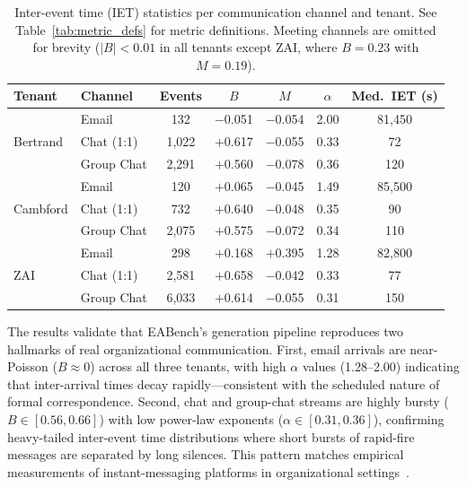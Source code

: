 \begin{table}[h]
\centering
\caption{Inter-event time (IET) statistics per communication channel and tenant. See Table~\ref{tab:metric_defs} for metric definitions. Meeting channels are omitted for brevity ($|B| < 0.01$ in all tenants except ZAI, where $B = 0.23$ with $M = 0.19$).}
\label{tab:iet_summary}
\small
\begin{tabular}{llccccc}
\toprule
\textbf{Tenant} & \textbf{Channel} & \textbf{Events} & \textbf{$B$} & \textbf{$M$} & \textbf{$\alpha$} & \textbf{Med.\ IET (s)} \\
\midrule
\multirow{3}{*}{Bertrand}
  & Email      & 132   & $-$0.051 & $-$0.054 & 2.00 & 81{,}450 \\
  & Chat (1:1) & 1{,}022 & $+$0.617 & $-$0.055 & 0.33 & 72       \\
  & Group Chat & 2{,}291 & $+$0.560 & $-$0.078 & 0.36 & 120      \\
\midrule
\multirow{3}{*}{Cambford}
  & Email      & 120   & $+$0.065 & $-$0.045 & 1.49 & 85{,}500 \\
  & Chat (1:1) & 732   & $+$0.640 & $-$0.048 & 0.35 & 90       \\
  & Group Chat & 2{,}075 & $+$0.575 & $-$0.072 & 0.34 & 110      \\
\midrule
\multirow{3}{*}{ZAI}
  & Email      & 298   & $+$0.168 & $+$0.395 & 1.28 & 82{,}800 \\
  & Chat (1:1) & 2{,}581 & $+$0.658 & $-$0.042 & 0.33 & 77       \\
  & Group Chat & 6{,}033 & $+$0.614 & $-$0.055 & 0.31 & 150      \\
\bottomrule
\end{tabular}
\end{table}

\noindent The results validate that EABench's generation pipeline reproduces two hallmarks of real organizational communication. First, email arrivals are near-Poisson ($B \approx 0$) across all three tenants, with high $\alpha$ values (1.28--2.00) indicating that inter-arrival times decay rapidly---consistent with the scheduled nature of formal correspondence. Second, chat and group-chat streams are highly bursty ($B \in [0.56, 0.66]$) with low power-law exponents ($\alpha \in [0.31, 0.36]$), confirming heavy-tailed inter-event time distributions where short bursts of rapid-fire messages are separated by long silences. This pattern matches empirical measurements of instant-messaging platforms in organizational settings~\cite{goh2008burstiness}.

